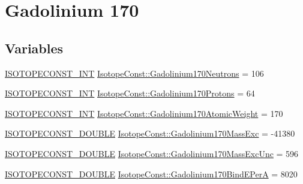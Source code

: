 \hypertarget{group___isotope_const-_gadolinium-_gd170}{}\section{Gadolinium 170}
\label{group___isotope_const-_gadolinium-_gd170}
\subsection*{Variables}
\begin{DoxyCompactItemize}
\item 
\mbox{\hyperlink{group___isotope_const-_macros_ga5f18360b3e99483a35c32d789e62621c}{I\+S\+O\+T\+O\+P\+E\+C\+O\+N\+S\+T\+\_\+\+I\+NT}} \mbox{\hyperlink{group___isotope_const-_gadolinium-_gd170_gaa57742dc88f6b0e2da0ba5a7bac4acda}{Isotope\+Const\+::\+Gadolinium170\+Neutrons}} = 106
\item 
\mbox{\hyperlink{group___isotope_const-_macros_ga5f18360b3e99483a35c32d789e62621c}{I\+S\+O\+T\+O\+P\+E\+C\+O\+N\+S\+T\+\_\+\+I\+NT}} \mbox{\hyperlink{group___isotope_const-_gadolinium-_gd170_gacb1a8d3c1f3ab09aabf168ebae37aeb9}{Isotope\+Const\+::\+Gadolinium170\+Protons}} = 64
\item 
\mbox{\hyperlink{group___isotope_const-_macros_ga5f18360b3e99483a35c32d789e62621c}{I\+S\+O\+T\+O\+P\+E\+C\+O\+N\+S\+T\+\_\+\+I\+NT}} \mbox{\hyperlink{group___isotope_const-_gadolinium-_gd170_ga754c58b5358a418ef04fb7f54f506574}{Isotope\+Const\+::\+Gadolinium170\+Atomic\+Weight}} = 170
\item 
\mbox{\hyperlink{group___isotope_const-_macros_ga8f45a7272ce02c0b4c65c44636ed719a}{I\+S\+O\+T\+O\+P\+E\+C\+O\+N\+S\+T\+\_\+\+D\+O\+U\+B\+LE}} \mbox{\hyperlink{group___isotope_const-_gadolinium-_gd170_gaf649d5582c8c99546716d7b6554c7b90}{Isotope\+Const\+::\+Gadolinium170\+Mass\+Exc}} = -\/41380
\item 
\mbox{\hyperlink{group___isotope_const-_macros_ga8f45a7272ce02c0b4c65c44636ed719a}{I\+S\+O\+T\+O\+P\+E\+C\+O\+N\+S\+T\+\_\+\+D\+O\+U\+B\+LE}} \mbox{\hyperlink{group___isotope_const-_gadolinium-_gd170_ga25b6683101628968d66ce0b3a6c98a94}{Isotope\+Const\+::\+Gadolinium170\+Mass\+Exc\+Unc}} = 596
\item 
\mbox{\hyperlink{group___isotope_const-_macros_ga8f45a7272ce02c0b4c65c44636ed719a}{I\+S\+O\+T\+O\+P\+E\+C\+O\+N\+S\+T\+\_\+\+D\+O\+U\+B\+LE}} \mbox{\hyperlink{group___isotope_const-_gadolinium-_gd170_ga9da01bbd5802e8cc9a9de8f485a8322d}{Isotope\+Const\+::\+Gadolinium170\+Bind\+E\+PerA}} = 8020
\item 

\end{DoxyCompactItemize}
